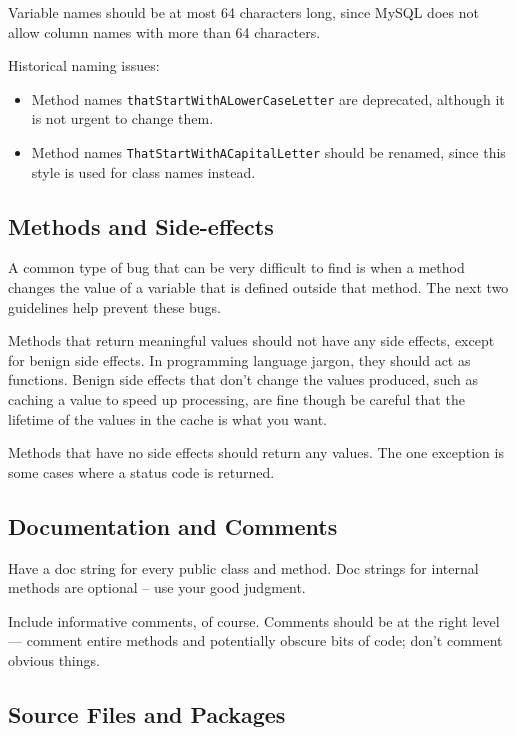 Variable names should be at most 64 characters long, since
MySQL  does not allow column names with more
than 64 characters.

Historical naming issues:
\begin{itemize}
\item Method names \verb|thatStartWithALowerCaseLetter| are deprecated, although
it is not urgent to change them.
\item Method names \verb|ThatStartWithACapitalLetter| should be renamed, since this
style is used for class names instead.
\end{itemize}

\subsection{Methods and Side-effects}

A common type of bug that can be very difficult to find is when a method
changes the value of a variable that is defined outside that method.  The next
two guidelines help prevent these bugs.

Methods that return meaningful values should not have any side effects, except
for benign side effects. In programming language jargon, they should act as
functions.  Benign side effects that don't change the values produced, such as
caching a value to speed up processing, are fine though be careful that the
lifetime of the values in the cache is what you want.

Methods that have no side effects should return any values.  The one exception
is some cases where a status code is returned.

\subsection{Documentation and Comments}

Have a doc string for every public class and method.  Doc strings for
internal methods are optional -- use your good judgment.

Include informative comments, of course.  Comments should be at the
right level --- comment entire methods and potentially obscure bits of
code; don't comment obvious things.

\subsection{Source Files and Packages}

